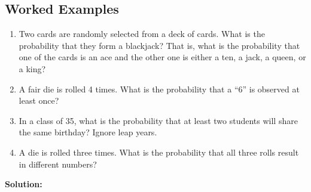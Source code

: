 \documentclass[
  12pt,
]{krantzNoCorner}
\providecommand{\tightlist}{%
  \setlength{\itemsep}{0pt}\setlength{\parskip}{0pt}}
\begin{document}
\hypertarget{worked-examples-1}{%
\subsection{Worked Examples}\label{worked-examples-1}}

\begin{enumerate}
\def\labelenumi{\arabic{enumi}.}
\tightlist
\item
  Two cards are randomly selected from a deck of cards. What is the
  probability that they form a blackjack? That is, what is the
  probability that one of the cards is an ace and the other one is
  either a ten, a jack, a queen, or a king?
\item
  A fair die is rolled 4 times. What is the probability that a ``6'' is
  observed at least once?
\item
  In a class of 35, what is the probability that at least two students
  will share the same birthday? Ignore leap years.
\item
  A die is rolled three times. What is the probability that all three
  rolls result in different numbers?
\end{enumerate}

\textbf{Solution:}
\end{document}
